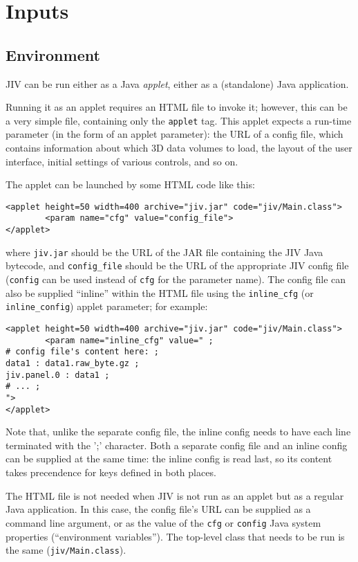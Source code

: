 %
%
%

\section{Inputs}
\label{sec:inputs}


\subsection{Environment}
\label{sec:environment}

JIV can be run either as a Java {\em applet}, either as a (standalone)
Java application. 

Running it as an applet requires an HTML file to invoke it; however,
this can be a very simple file, containing only the \verb+applet+ tag.
This applet expects a run-time parameter (in the form of an applet
parameter): the URL of a config file, which contains information about
which 3D data volumes to load, the layout of the user interface,
initial settings of various controls, and so on.

The applet can be launched by some HTML code like this:
\begin{verbatim}
<applet height=50 width=400 archive="jiv.jar" code="jiv/Main.class">
        <param name="cfg" value="config_file">
</applet>
\end{verbatim}
where \verb+jiv.jar+ should be the URL of the JAR file containing the
JIV Java bytecode, and \verb+config_file+ should be the URL of the
appropriate JIV config file (\verb+config+ can be used instead of
\verb+cfg+ for the parameter name). The config file can also be
supplied ``inline'' within the HTML file using the \verb+inline_cfg+
(or \verb+inline_config+) applet parameter; for
example:
\begin{verbatim}
<applet height=50 width=400 archive="jiv.jar" code="jiv/Main.class">
        <param name="inline_cfg" value=" ;
# config file's content here: ;
data1 : data1.raw_byte.gz ;
jiv.panel.0 : data1 ;
# ... ;
">
</applet>
\end{verbatim}
Note that, unlike the separate config file, the inline config needs to
have each line terminated with the ';' character.  Both a separate
config file and an inline config can be supplied at the same time: the
inline config is read last, so its content takes precendence for keys
defined in both places.

The HTML file is not needed when JIV is not run as an applet but as a
regular Java application. In this case, the config file's URL can be
supplied as a command line argument, or as the value of the \verb+cfg+
or \verb+config+ Java system properties (``environment variables'').
The top-level class that needs to be run is the same
(\verb+jiv/Main.class+).


